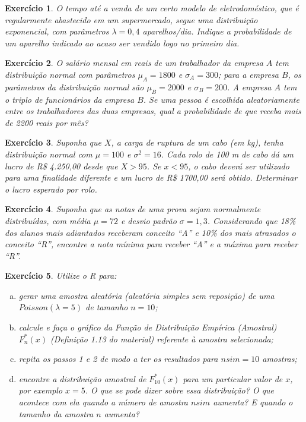\documentclass[letter,11pt]{article}
\newtheorem{exer}{Exercício}
\begin{document}
\medskip
\begin{exer} \rm 
O tempo até a venda de um certo modelo de eletrodoméstico, que é regularmente 
abastecido em um supermercado, segue uma distribuição exponencial, com 
parâmetros $\lambda=0,4$ aparelhos/dia. Indique a probabilidade de um aparelho 
indicado ao acaso ser vendido logo no primeiro dia.
\end{exer}%

\medskip
\begin{exer} \rm
O salário mensal em reais de um trabalhador da empresa $ A$ tem distribuição normal
com parâmetros $\mu_A = 1800$ e $\sigma_A = 300$; para a empresa $B$, os parâmetros da distribuição normal são $\mu_B = 2000$ e $\sigma_B = 200$. A empresa $A$ tem o triplo de funcionários da empresa $B$. Se uma pessoa é escolhida aleatoriamente entre os trabalhadores das duas empresas, qual a probabilidade de que receba mais de 2200 reais por mês?
\end{exer}%

\medskip
\begin{exer} \rm 
Suponha que $X$, a carga de ruptura de um cabo (em kg), tenha distribuição normal com $\mu= 100$ e $\sigma^2 = 16$. Cada rolo de 100 m de cabo dá um lucro de R\$ 4.250,00 desde que $X > 95$. Se $x < 95$, o cabo deverá ser utilizado para uma finalidade diferente e um lucro de R\$ 1700,00 será obtido. Determinar o lucro esperado por rolo.
\end{exer}%

\medskip
\begin{exer} \rm 
Suponha que as notas de uma prova sejam normalmente distribuídas, com média $\mu=72$ e desvio padrão $\sigma=1,3$. Considerando que 18\% dos alunos mais adiantados receberam conceito “A” e 10\% dos mais atrasados o conceito “R”, encontre a nota mínima para receber “A” e a máxima para receber “R”.
\end{exer}%

\medskip
\begin{exer} \rm
Utilize o R para:
\begin{enumerate}[a)]
  \item gerar uma amostra aleatória (aleatória simples sem reposição) de uma 
  $Poisson(\lambda = 5)$ de tamanho $n = 10$;
  \item calcule e faça o gráfico da Função de Distribuição Empírica (Amostral) 
  $F^*_{n}(x)$ (Definição 1.13 do material) referente à amostra selecionada;
  \item repita os passos 1 e 2 de modo a ter os resultados para $nsim = 10$ amostras; 
  \item encontre a distribuição amostral de $F^*_{10}(x)$ para um particular valor de $x$, 
  por exemplo $x = 5$. O que se pode dizer sobre essa distribuição? O que acontece 
  com ela quando a número de amostra $nsim$ aumenta? E quando o tamanho da amostra $n$ 
  aumenta?
\end{enumerate}
\end{exer}
  
\end{document}
